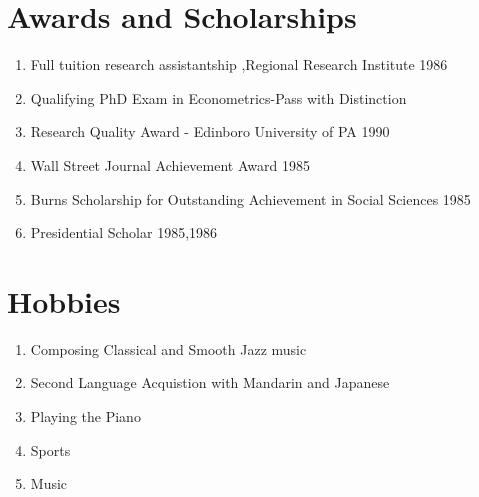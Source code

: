 \documentclass{ResumeDesignFormat1}
\begin{document}
\section{Awards and Scholarships}
\begin{enumerate} \itemsep -2pt
\item Full tuition research assistantship ,Regional Research Institute 1986  \\
\item Qualifying PhD Exam in Econometrics-Pass with Distinction\\
\item Research Quality Award - Edinboro University of PA 1990\\
\item Wall Street Journal Achievement Award 1985\\
\item Burns Scholarship for Outstanding Achievement in Social Sciences 1985\\
\item Presidential Scholar 1985,1986\\
\end{enumerate}
\section{Hobbies}

\begin{enumerate}
\item Composing Classical and Smooth Jazz music
\item Second Language Acquistion with Mandarin and Japanese
\item Playing the Piano 
\item Sports
\item Music
\end{enumerate}
\end{document}
